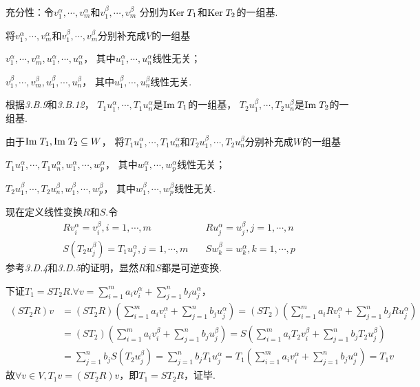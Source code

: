 充分性：令\(v_1^\alpha,\cdots,v_m^\alpha\)和\(v_1^\beta,\cdots,v_m^\beta\)
分别为\(\mathrm{Ker \;} T_1\)和\(\mathrm{Ker \;} T_2\)的一组基.

将\(v_1^\alpha,\cdots,v_m^\alpha\)和\(v_1^\beta,\cdots,v_m^\beta\)分别补充成\(V\)的一组基

\(v_1^\alpha,\cdots,v_m^\alpha,u_1^\alpha,\cdots,u_n^\alpha\)，
其中\(u_1^\alpha,\cdots,u_n^\alpha\)线性无关；

\(v_1^\beta,\cdots,v_m^\beta,u_1^\beta,\cdots,u_n^\beta\)，
其中\(u_1^\beta,\cdots,u_n^\beta\)线性无关.

根据\textit{3.B.9}和\textit{3.B.12}，
\(T_1u_1^\alpha,\cdots,T_1u_n^\alpha\)是\(\mathrm{Im \;} T_1\)的一组基，
\(T_2u_1^\beta,\cdots,T_2u_n^\beta\)是\(\mathrm{Im \;} T_2\)的一组基.

由于\(\mathrm{Im \;} T_1,\mathrm{Im \;} T_2 \subseteq W\)，
将\(T_1u_1^\alpha,\cdots,T_1u_n^\alpha\)和\(T_2u_1^\beta,\cdots,T_2u_n^\beta\)分别补充成\(W\)的一组基

\(T_1u_1^\alpha,\cdots,T_1u_n^\alpha,w_1^\alpha,\cdots,w_p^\alpha\)，
其中\(w_1^\alpha,\cdots,w_p^\alpha\)线性无关；

\(T_2u_1^\beta,\cdots,T_2u_n^\beta,w_1^\beta,\cdots,w_p^\beta\)，
其中\(w_1^\beta,\cdots,w_p^\beta\)线性无关.

现在定义线性变换\(R\)和\(S\).令
    \begin{align*}
        Rv_i^\alpha=v_i^\beta,i=1,\cdots,m &\quad Ru_j^\alpha=u_j^\beta,j=1,\cdots,n \\
        S(T_2u_j^\beta)=T_1u_j^\alpha,j=1,\cdots,m &\quad Sw_k^\beta=w_k^\alpha,k=1,\cdots,p
    \end{align*}
参考\textit{3.D.4}和\textit{3.D.5}的证明，显然\(R\)和\(S\)都是可逆变换.

下证\(T_1=ST_2R\).\(\forall v=\sum_{i=1}^m a_iv_i^\alpha+\sum_{j=1}^n b_ju_j^\alpha\)，
    \begin{align*}
        (ST_2R)v &=(ST_2R)(\sum_{i=1}^m a_iv_i^\alpha+\sum_{j=1}^n b_ju_j^\alpha)
                =(ST_2)(\sum_{i=1}^m a_iRv_i^\alpha+\sum_{j=1}^n b_jRu_j^\alpha) \\
                &=(ST_2)(\sum_{i=1}^m a_iv_i^\beta+\sum_{j=1}^n b_ju_j^\beta)
                =S(\sum_{i=1}^m a_iT_2v_i^\beta+\sum_{j=1}^n b_jT_2u_j^\beta) \\
                &=\sum_{j=1}^n b_jS(T_2u_j^\beta)=\sum_{j=1}^n b_jT_1u_j^\alpha
                =T_1(\sum_{i=1}^m a_iv_i^\alpha+\sum_{j=1}^n b_ju_j^\alpha)=T_1v
    \end{align*}
故\(\forall v \in V,T_1v=(ST_2R)v\)，即\(T_1=ST_2R\)，证毕.


